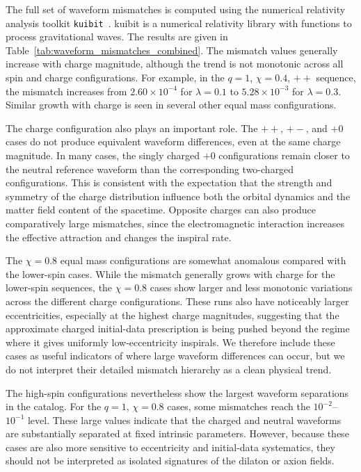 The full set of waveform mismatches is computed using the numerical relativity analysis toolkit \texttt{kuibit}~\cite{kuibit}. kuibit is a numerical relativity library with functions to process gravitational waves.  The results are given in Table~\ref{tab:waveform_mismatches_combined}. The mismatch values generally increase with charge magnitude, although the trend is not monotonic across all spin and charge configurations. For example, in the $q=1$, $\chi=0.4$, $++$ sequence, the mismatch increases from $2.60\times10^{-4}$ for $\lambda=0.1$ to $5.28\times10^{-3}$ for $\lambda=0.3$. Similar growth with charge is seen in several other equal mass configurations.

The charge configuration also plays an important role. The $++$, $+-$, and $+0$ cases do not produce equivalent waveform differences, even at the same charge magnitude. In many cases, the singly charged $+0$ configurations remain closer to the neutral reference waveform than the corresponding two-charged configurations. This is consistent with the expectation that the strength and symmetry of the charge distribution influence both the orbital dynamics and the matter field content of the spacetime. Opposite charges can also produce comparatively large mismatches, since the electromagnetic interaction increases the effective attraction and changes the inspiral rate.

The $\chi=0.8$ equal mass configurations are somewhat anomalous compared with the lower-spin cases. While the mismatch generally grows with charge for the lower-spin sequences, the $\chi=0.8$ cases show larger and less monotonic variations across the different charge configurations. These runs also have noticeably larger eccentricities, especially at the highest charge magnitudes, suggesting that the approximate charged initial-data prescription is being pushed beyond the regime where it gives uniformly low-eccentricity inspirals. We therefore include these cases as useful indicators of where large waveform differences can occur, but we do not interpret their detailed mismatch hierarchy as a clean physical trend.

The high-spin configurations nevertheless show the largest waveform separations in the catalog. For the $q=1$, $\chi=0.8$ cases, some mismatches reach the $10^{-2}$--$10^{-1}$ level. These large values indicate that the charged and neutral waveforms are substantially separated at fixed intrinsic parameters. However, because these cases are also more sensitive to eccentricity and initial-data systematics, they should not be interpreted as isolated signatures of the dilaton or axion fields.

